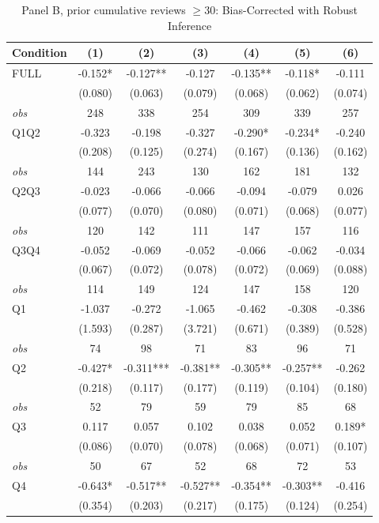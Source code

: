 \begin{table}[!htbp]
\centering
\caption{Panel B, prior cumulative reviews $\geq30$: Bias-Corrected with Robust Inference}
\begin{tabular}{lcccccc}
\toprule
Condition & (1) & (2) & (3) & (4) & (5) & (6) \\
\midrule
FULL & -0.152* & -0.127** & -0.127 & -0.135** & -0.118* & -0.111 \\
 & (0.080) & (0.063) & (0.079) & (0.068) & (0.062) & (0.074) \\
\textit{obs} & 248 & 338 & 254 & 309 & 339 & 257 \\
Q1Q2 & -0.323 & -0.198 & -0.327 & -0.290* & -0.234* & -0.240 \\
 & (0.208) & (0.125) & (0.274) & (0.167) & (0.136) & (0.162) \\
\textit{obs} & 144 & 243 & 130 & 162 & 181 & 132 \\
Q2Q3 & -0.023 & -0.066 & -0.066 & -0.094 & -0.079 & 0.026 \\
 & (0.077) & (0.070) & (0.080) & (0.071) & (0.068) & (0.077) \\
\textit{obs} & 120 & 142 & 111 & 147 & 157 & 116 \\
Q3Q4 & -0.052 & -0.069 & -0.052 & -0.066 & -0.062 & -0.034 \\
 & (0.067) & (0.072) & (0.078) & (0.072) & (0.069) & (0.088) \\
\textit{obs} & 114 & 149 & 124 & 147 & 158 & 120 \\
Q1 & -1.037 & -0.272 & -1.065 & -0.462 & -0.308 & -0.386 \\
 & (1.593) & (0.287) & (3.721) & (0.671) & (0.389) & (0.528) \\
\textit{obs} & 74 & 98 & 71 & 83 & 96 & 71 \\
Q2 & -0.427* & -0.311*** & -0.381** & -0.305** & -0.257** & -0.262 \\
 & (0.218) & (0.117) & (0.177) & (0.119) & (0.104) & (0.180) \\
\textit{obs} & 52 & 79 & 59 & 79 & 85 & 68 \\
Q3 & 0.117 & 0.057 & 0.102 & 0.038 & 0.052 & 0.189* \\
 & (0.086) & (0.070) & (0.078) & (0.068) & (0.071) & (0.107) \\
\textit{obs} & 50 & 67 & 52 & 68 & 72 & 53 \\
Q4 & -0.643* & -0.517** & -0.527** & -0.354** & -0.303** & -0.416 \\
 & (0.354) & (0.203) & (0.217) & (0.175) & (0.124) & (0.254) \\

\end{tabular}
\end{table}
